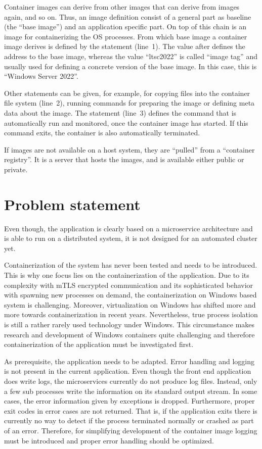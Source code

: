 Container images can derive from other images that can derive from images again, and so on. Thus, an image definition consist of a general part as baseline (the \enquote{base image}) and an application specific part. On top of this chain is an image for containerizing the \ac{OS} processes. From which base image a container image derives is defined by the  statement (line~1).
The value after  defines the address to the base image, whereas the value \enquote{ltsc2022} is called \enquote{image tag} and usually used for defining a concrete version of the base image. In this case, this is \enquote{\ac{Windows} Server 2022}.

Other statements can be given, for example, for copying files into the container file system (line~2), running commands for preparing the image or defining meta data about the image. The statement  (line~3) defines the command that is automatically run and monitored, once the container image has started. If this command exits, the container is also automatically terminated.

If images are not available on a host system, they are \enquote{pulled} from a \enquote{container registry}. It is a server that hosts the images, and is available either public or private.


\section{Problem statement}
Even though, the application is clearly based on a microservice architecture and is able to run on a distributed system, it is not designed for an automated cluster yet.

Containerization of the system has never been tested and needs to be introduced. 
This is why one focus lies on the containerization of the application. Due to its complexity with \ac{mTLS} encrypted communication and its sophisticated behavior with spawning new processes on demand, the containerization on \ac{Windows} based system is challenging.
Moreover, virtualization on \ac{Windows} has shifted more and more towards containerization in recent years. Nevertheless, true process isolation is still a rather rarely used technology under Windows. This circumstance makes research and development of \ac{Windows} containers quite challenging and therefore containerization of the application must be investigated first.

As prerequisite, the application needs to be adapted. Error handling and logging is not present in the current application. 
Even though the front end application does write logs, the microservices currently do not produce log files. Instead, only a few sub processes write the information on its standard output stream. In some cases, the error information given by exceptions is dropped.
Furthermore, proper exit codes in error cases are not returned. That is, if the application exits there is currently no way to detect if the process terminated normally or crashed as part of an error.
Therefore, for simplifying development of the container image logging must be introduced and proper error handling should be optimized.


